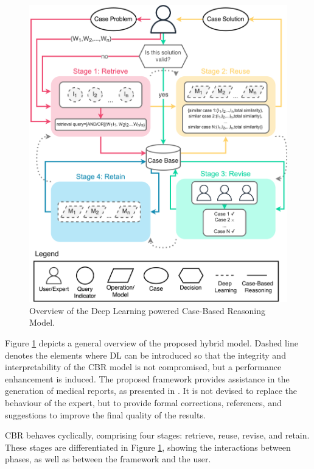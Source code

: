\begin{figure}[t]
    \centering
    \includegraphics[width=.8\linewidth]{5_dlintegrationkbs/figures/Overview_CBR_DL.eps}
    \caption{Overview of the Deep Learning powered Case-Based Reasoning Model.}
    \label{fig:overview_CBR_DL}
\end{figure}

Figure \ref{fig:overview_CBR_DL} depicts a general overview of the proposed hybrid model. Dashed line denotes the elements where DL can be introduced so that the integrity and interpretability of the CBR model is not compromised, but a performance enhancement is induced. The proposed framework provides assistance in the generation of medical reports, as presented in \cite{DBLP:journals/ijimai/Amador-Dominguez21}. It is not devised to replace the behaviour of the expert, but to provide formal corrections, references, and suggestions to improve the final quality of the results. 

CBR behaves cyclically, comprising four stages: retrieve, reuse, revise, and retain. These stages are differentiated in Figure \ref{fig:overview_CBR_DL}, showing the interactions between phases, as well as between the framework and the user. 

\color{purple}

